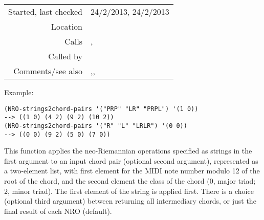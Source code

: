 \vspace{0.3cm}
\begin{tabular}{r|p{8cm}}
Started, last checked & 24/2/2013, 24/2/2013 \\
Location & \nameref{sec:NRO} \\
Calls & \nameref{fun:my-last}, \nameref{fun:NRO-string2chord-pairs} \\
Called by & \\
Comments/see also & \nameref{fun:chord-pair2NRO-string},\newline \nameref{fun:chord-pairs2NRO-strings},\newline \nameref{fun:NRO-string2chord-pairs}
\end{tabular}

\vspace{0.5cm}
\noindent Example:
\begin{verbatim}
(NRO-strings2chord-pairs '("PRP" "LR" "PRPL") '(1 0))
--> ((1 0) (4 2) (9 2) (10 2))
(NRO-strings2chord-pairs '("R" "L" "LRLR") '(0 0))
--> ((0 0) (9 2) (5 0) (7 0))
\end{verbatim}

\noindent This function applies the neo-Riemannian
operations specified as strings in the first argument
to an input chord pair (optional second argument),
represented as a two-element list, with first element
for the MIDI note number modulo 12 of the root of the
chord, and the second element the class of the chord
(0, major triad; 2, minor triad). The first element of
the string is applied first. There is a choice
(optional third argument) between returning all
intermediary chords, or just the final result of each
NRO (default).




























